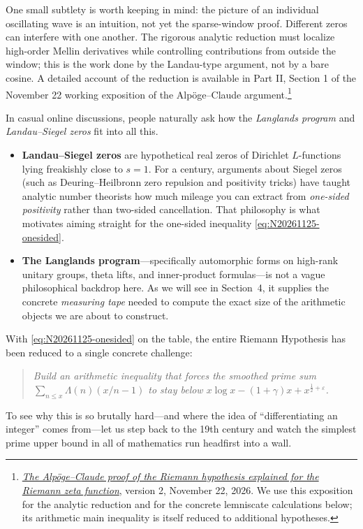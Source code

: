 One small subtlety is worth keeping in mind: the picture of an individual oscillating wave is an intuition, not yet the sparse-window proof. Different zeros can interfere with one another. The rigorous analytic reduction must localize high-order Mellin derivatives while controlling contributions from outside the window; this is the work done by the Landau-type argument, not by a bare cosine. A detailed account of the reduction is available in Part II, Section 1 of the November 22 working exposition of the Alp\"oge--Claude argument.\footnote{\href{https://www.math.uwaterloo.ca/~mrubinst/alpoge_claude_grh/zeta-paper_v2.pdf}{\emph{The Alp\"oge--Claude proof of the Riemann hypothesis explained for the Riemann zeta function}}, version 2, November 22, 2026. We use this exposition for the analytic reduction and for the concrete lemniscate calculations below; its arithmetic main inequality is itself reduced to additional hypotheses.}

\begin{remark}
In casual online discussions, people naturally ask how the \emph{Langlands program} and \emph{Landau--Siegel zeros} fit into all this.
\begin{itemize}
  \item \textbf{Landau--Siegel zeros} are hypothetical real zeros of Dirichlet \(L\)-functions lying freakishly close to \(s=1\). For a century, arguments about Siegel zeros (such as Deuring--Heilbronn zero repulsion and positivity tricks) have taught analytic number theorists how much mileage you can extract from \emph{one-sided positivity} rather than two-sided cancellation. That philosophy is what motivates aiming straight for the one-sided inequality \eqref{eq:N20261125-onesided}.
  \item \textbf{The Langlands program}---specifically automorphic forms on high-rank unitary groups, theta lifts, and inner-product formulas---is not a vague philosophical backdrop here. As we will see in Section~4, it supplies the concrete \emph{measuring tape} needed to compute the exact size of the arithmetic objects we are about to construct.
\end{itemize}
\end{remark}

With \eqref{eq:N20261125-onesided} on the table, the entire Riemann Hypothesis has been reduced to a single concrete challenge:
\begin{quote}
\emph{Build an arithmetic inequality that forces the smoothed prime sum \(\sum_{n\le x}\Lambda(n)(x/n - 1)\) to stay below \(x\log x - (1+\gamma)x + x^{\frac{1}{2}+\varepsilon}\).}
\end{quote}
To see why this is so brutally hard---and where the idea of ``differentiating an integer'' comes from---let us step back to the 19th century and watch the simplest prime upper bound in all of mathematics run headfirst into a wall.


